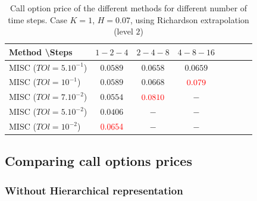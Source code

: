 \documentclass[11pt]{article}
\begin{document}
\begin{table}[h!]
	\centering
	\begin{tabular}{l*{6}{c}r}
		Method \textbackslash  Steps    &$1-2-4$         & $2-4-8$ & $4-8-16$ \\
		\hline
		MISC ($TOl=5.10^{-1}$)  &$0.0589$ & $0.0658$ & $0.0659$  \\
		MISC ($TOl=10^{-1}$)  &$0.0589$ & $0.0668$ & ${\color{red}0.079}$   \\
		MISC ($TOl=7.10^{-2}$)   &$0.0554$ & ${\color{red}0.0810}$ & $-$   \\
		MISC ($TOl=5.10^{-2}$)   &$0.0406$ & $-$ & $-$   \\
		MISC ($TOl=10^{-2}$)  &${\color{red}0.0654}$ & $-$ & $-$   \\	
		\hline
	\end{tabular}
	\caption{ Call option price of the different methods for different number of time steps. Case $K=1$, $H=0.07$, using Richardson extrapolation (level $2$)}
	\label{table: Call option price of the different methods for different number of time steps. Case $K=1$, $H=0.07$, using Richardson extrapolation_level2}
\end{table}



\newpage
\subsection{Comparing call options prices }\label{sec:Comparing call options prices rbergomi}


\subsubsection{Without Hierarchical representation}
\end{document}
